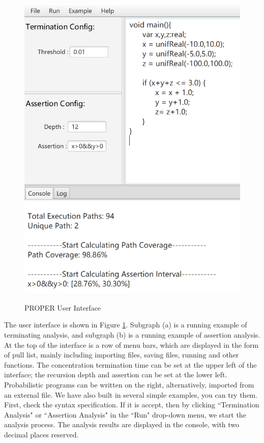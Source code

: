 \documentclass[runningheads]{llncs}
\begin{document}
\begin{figure}[htbp]
{		\includegraphics[scale=0.47]{img/interface2} 
	}
	\caption{PROPER User Interface} %
	\label{interface} %
\end{figure}
The user interface is shown in Figure \ref{interface}. Subgraph (a) is a running example of terminating analysis, and subgraph (b) is a running example of assertion analysis. At the top of the interface is a row of menu bars, which are displayed in the form of pull list, mainly including importing files, saving files, running and other functions. The concentration termination time can be set at the upper left of the interface; the recursion depth and assertion can be set at the lower left. Probabilistic programs can be written on the right, alternatively, imported from an external file. We have also built in several simple examples, you can try them. First, check the syntax specification. If it is accept, then by clicking ``Termination Analysis" or ``Assertion Analysis" in the ``Run" drop-down menu, we start the analysis process. The analysis results are displayed in the console, with two decimal places reserved.
\end{document}
